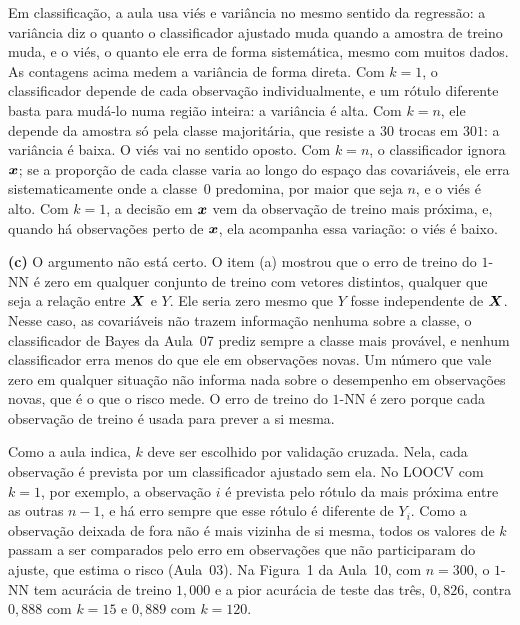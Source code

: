 \documentclass[11pt,a4paper]{article}
\begin{document}
\begin{solucao}
Em classificação, a aula usa viés e variância no mesmo sentido da regressão: a variância
diz o quanto o classificador ajustado muda quando a amostra de treino muda, e o viés, o
quanto ele erra de forma sistemática, mesmo com muitos dados. As contagens acima medem a
variância de forma direta. Com $k=1$, o classificador depende de cada observação
individualmente, e um rótulo diferente basta para mudá-lo numa região inteira: a
variância é alta. Com $k=n$, ele depende da amostra só pela classe majoritária, que
resiste a $30$ trocas em $301$: a variância é baixa. O viés vai no sentido oposto. Com
$k=n$, o classificador ignora $\bm{x}$; se a proporção de cada classe varia ao longo do
espaço das covariáveis, ele erra sistematicamente onde a classe~$0$ predomina, por maior
que seja $n$, e o viés é alto. Com $k=1$, a decisão em $\bm{x}$ vem da observação de treino
mais próxima, e, quando há observações perto de $\bm{x}$, ela acompanha essa variação: o viés
é baixo.

\smallskip
\textbf{(c)} O argumento não está certo. O item (a) mostrou que o erro de treino do
$1$-NN é zero em qualquer conjunto de treino com vetores distintos, qualquer que seja a
relação entre $\bm{X}$ e $Y$. Ele seria zero mesmo que $Y$ fosse independente de $\bm{X}$. Nesse
caso, as covariáveis não trazem informação nenhuma sobre a classe, o classificador de
Bayes da Aula~07 prediz sempre a classe mais provável, e nenhum classificador erra menos
do que ele em observações novas. Um número que vale zero em qualquer situação não informa
nada sobre o desempenho em observações novas, que é o que o risco mede. O erro de treino
do $1$-NN é zero porque cada observação de treino é usada para prever a si mesma.

Como a aula indica, $k$ deve ser escolhido por validação cruzada. Nela, cada observação
é prevista por um classificador ajustado sem ela. No LOOCV com $k=1$, por exemplo, a
observação $i$ é prevista pelo rótulo da mais próxima entre as outras $n-1$, e há erro
sempre que esse rótulo é diferente de $Y_i$. Como a observação deixada de fora não é
mais vizinha de si mesma, todos os valores de $k$ passam a ser comparados pelo erro em
observações que não participaram do ajuste, que estima o risco (Aula~03). Na Figura~1 da
Aula~10, com $n=300$, o $1$-NN tem acurácia de treino $1{,}000$ e a pior acurácia de
teste das três, $0{,}826$, contra $0{,}888$ com $k=15$ e $0{,}889$ com $k=120$.
\end{solucao}
\end{document}
